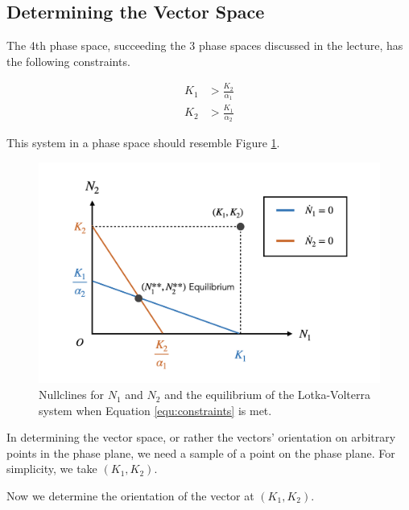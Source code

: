 \subsection{Determining the Vector Space}
The 4th phase space, succeeding the 3 phase spaces discussed in the lecture, has the following constraints.

\begin{equation}
  \label{equ:constraints}
  \begin{aligned}
    K_1 &> \frac {K_2} {\alpha_1} \\
    K_2 &> \frac {K_1} {\alpha_2}
  \end{aligned}
\end{equation}

This system in a phase space should resemble Figure \ref{fig:graph_001}.

\begin{figure}[h]
  \centering
  \includegraphics[width = \textwidth]{fig/graph_001.png}
  \caption {Nullclines for $N_1$ and $N_2$ and the equilibrium of the Lotka-Volterra system when Equation \ref{equ:constraints} is met.}
  \label{fig:graph_001}
\end{figure}

In determining the vector space, or rather the vectors' orientation on arbitrary points in the phase plane, we need a sample of a point on the phase plane. For simplicity, we take $(K_1, K_2)$.

Now we determine the orientation of the vector at $(K_1, K_2)$.
